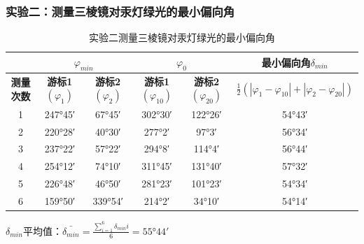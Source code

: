 \documentclass[]{../template/Report}%
\begin{document}
\begin{fullreportonly}
\subsubsection{实验二：测量三棱镜对汞灯绿光的最小偏向角}
\begin{table}[H]
    \centering
    \caption{实验二测量三棱镜对汞灯绿光的最小偏向角}
    \begin{tabular}{|c|c|c|c|c|c|}
        \hline
         & 
        \multicolumn{2}{|c|}{\textbf{$\varphi_{min}$}} &
        \multicolumn{2}{|c|}{\textbf{$\varphi_{0}$}} &
        \textbf{最小偏向角$\delta_{min}$}  \\
        \hline
        \textbf{测量次数} & \textbf{游标1$(\varphi _1)$} & \textbf{游标2$(\varphi _2)$} & \textbf{游标1$(\varphi_{10})$} & \textbf{游标2$(\varphi_{20})$} & \textbf{$\frac{1}{2}(|\varphi_1 - \varphi_{10}| + |\varphi_2 - \varphi_{20}|)$}  \\
        \hline
        1 & \ang{247;45} & \ang{67;45} & \ang{302;30} & \ang{122;26} & \ang{54;43}  \\
        \hline
        2 & \ang{220;28} & \ang{40;30} & \ang{277;2} & \ang{97;3} & \ang{56;34}  \\
        \hline
        3 & \ang{237;22} & \ang{57;22} & \ang{294;8} & \ang{114;4} & \ang{56;44}  \\
        \hline
        4 & \ang{254;12} & \ang{74;10} & \ang{311;45} & \ang{131;40} & \ang{57;32}  \\
        \hline
        5 & \ang{226;48} & \ang{46;50} & \ang{281;23} & \ang{101;23} & \ang{54;34}  \\
        \hline
        6 & \ang{159;50} & \ang{339;54} & \ang{214;2} & \ang{34;10} & \ang{54;14}  \\
        \hline
    \end{tabular}
\end{table}
$\delta_{min}$平均值：$\bar{\delta_{min}} = \frac{\displaystyle\sum_{i=1}^6 \delta_{min}i}{6} = \ang{55;44}$



\end{fullreportonly}
\end{document}
